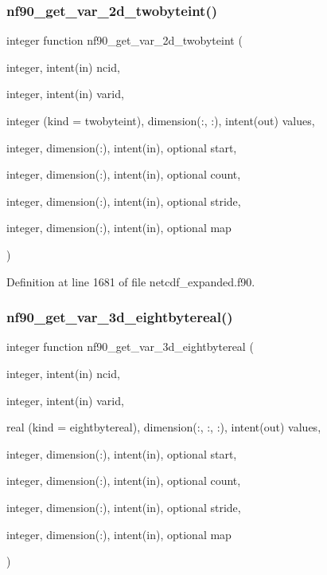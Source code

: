 \subsubsection{\texorpdfstring{nf90\+\_\+get\+\_\+var\+\_\+2d\+\_\+twobyteint()}{nf90\_get\_var\_2d\_twobyteint()}}
{\footnotesize\ttfamily integer function nf90\+\_\+get\+\_\+var\+\_\+2d\+\_\+twobyteint (\begin{DoxyParamCaption}\item[{integer, intent(in)}]{ncid,  }\item[{integer, intent(in)}]{varid,  }\item[{integer (kind = twobyteint), dimension(\+:, \+:), intent(out)}]{values,  }\item[{integer, dimension(\+:), intent(in), optional}]{start,  }\item[{integer, dimension(\+:), intent(in), optional}]{count,  }\item[{integer, dimension(\+:), intent(in), optional}]{stride,  }\item[{integer, dimension(\+:), intent(in), optional}]{map }\end{DoxyParamCaption})}



Definition at line 1681 of file netcdf\+\_\+expanded.\+f90.

\mbox{\label{netcdf__expanded_8f90_a6303024b966f78850d884c5acb757da7}} 
\subsubsection{\texorpdfstring{nf90\+\_\+get\+\_\+var\+\_\+3d\+\_\+eightbytereal()}{nf90\_get\_var\_3d\_eightbytereal()}}
{\footnotesize\ttfamily integer function nf90\+\_\+get\+\_\+var\+\_\+3d\+\_\+eightbytereal (\begin{DoxyParamCaption}\item[{integer, intent(in)}]{ncid,  }\item[{integer, intent(in)}]{varid,  }\item[{real (kind = eightbytereal), dimension(\+:, \+:, \+:), intent(out)}]{values,  }\item[{integer, dimension(\+:), intent(in), optional}]{start,  }\item[{integer, dimension(\+:), intent(in), optional}]{count,  }\item[{integer, dimension(\+:), intent(in), optional}]{stride,  }\item[{integer, dimension(\+:), intent(in), optional}]{map }\end{DoxyParamCaption})}



